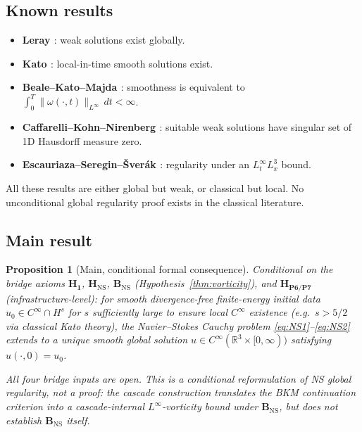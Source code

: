 \documentclass[11pt, a4paper]{amsart}
\newtheorem{proposition}[theorem]{Proposition}
\theoremstyle{definition}
\newcommand{\R}{\mathbb{R}}
\begin{document}
\subsection{Known results}

\begin{itemize}
\item \textbf{Leray \cite{Leray1934}}: weak solutions exist globally.
\item \textbf{Kato \cite{Kato}}: local-in-time smooth solutions exist.
\item \textbf{Beale--Kato--Majda \cite{BKM}}: smoothness is equivalent
to $\int_0^T \|\omega(\cdot, t)\|_{L^\infty} \, dt < \infty$.
\item \textbf{Caffarelli--Kohn--Nirenberg \cite{CKN1982}}: suitable
weak solutions have singular set of 1D Hausdorff measure zero.
\item \textbf{Escauriaza--Seregin--\v{S}ver\'ak \cite{ESS2003}}: regularity
under an $L^\infty_t L^3_x$ bound.
\end{itemize}

All these results are either global but weak, or classical but local.
No unconditional global regularity proof exists in the classical
literature.

\subsection{Main result}

\begin{proposition}[Main, conditional formal consequence]\label{thm:main}
\emph{Conditional on the bridge axioms} $\mathbf{H_1}$,
$\mathbf{H_{\mathrm{NS}}}$, $\mathbf{B_{\mathrm{NS}}}$
(Hypothesis~\ref{thm:vorticity}), and $\mathbf{H_{\text{P6/P7}}}$
(infrastructure-level): for smooth divergence-free
finite-energy initial data $u_0 \in C^\infty \cap H^s$ for
$s$ sufficiently large to ensure local $C^\infty$ existence
(e.g.\ $s > 5/2$ via classical Kato theory), the Navier--Stokes
Cauchy problem \eqref{eq:NS1}--\eqref{eq:NS2} extends to a unique
smooth global solution $u \in C^\infty(\R^3 \times [0, \infty))$
satisfying $u(\cdot, 0) = u_0$.

\emph{All four bridge inputs are open. This is a conditional
reformulation of NS global regularity, not a proof: the cascade
construction translates the BKM continuation criterion into a
cascade-internal $L^\infty$-vorticity bound under
$\mathbf{B_{\mathrm{NS}}}$, but does not establish $\mathbf{B_{\mathrm{NS}}}$
itself.}
\end{proposition}
\end{document}

